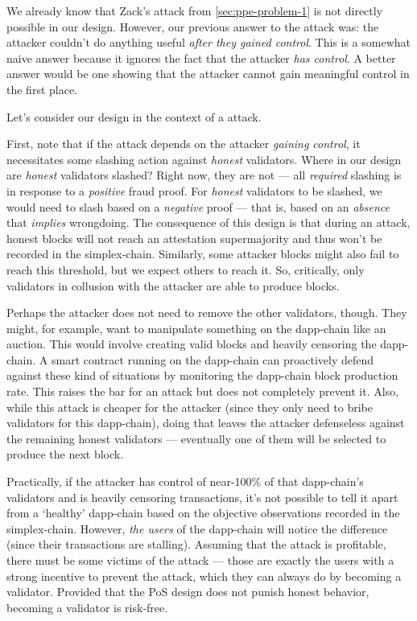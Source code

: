 We already know that Zack's attack from \autoref{sec:ppe-problem-1} is not directly possible in our design.
However, our previous answer to the attack was: the attacker couldn't do anything useful \emph{after they gained control}.
This is a somewhat naive answer because it ignores the fact that the attacker \emph{has control}.
A better answer would be one showing that the attacker cannot gain meaningful control in the first place.

Let's consider our design in the context of a \ppe attack.

First, note that if the attack depends on the attacker \emph{gaining control}, it necessitates some slashing action against \emph{honest} validators.
Where in our design are \emph{honest} validators slashed?
Right now, they are not --- all \emph{required} slashing is in response to a \emph{positive} fraud proof.
For \emph{honest} validators to be slashed, we would need to slash based on a \emph{negative} proof --- that is, based on an \emph{absence} that \emph{implies} wrongdoing.
The consequence of this design is that during an attack, honest blocks will not reach an attestation supermajority and thus won't be recorded in the simplex-chain.
Similarly, some attacker blocks might also fail to reach this threshold, but we expect others to reach it.
So, critically, only validators in collusion with the attacker are able to produce blocks.

Perhaps the attacker does not need to remove the other validators, though.
They might, for example, want to manipulate something on the dapp-chain like an auction.
This would involve creating valid blocks and heavily censoring the dapp-chain.
A smart contract running on the dapp-chain can proactively defend against these kind of situations by monitoring the dapp-chain block production rate.
This raises the bar for an attack but does not completely prevent it.
Also, while this attack is cheaper for the attacker (since they only need to bribe validators for this dapp-chain), doing that leaves the attacker defenseless against the remaining honest validators --- eventually one of them will be selected to produce the next block.

Practically, if the attacker has control of near-100\% of that dapp-chain's validators and is heavily censoring transactions, it's not possible to tell it apart from a `healthy' dapp-chain based on the objective observations recorded in the simplex-chain.
However, \emph{the users} of the dapp-chain will notice the difference (since their transactions are stalling).
Assuming that the attack is profitable, there must be some victims of the attack --- those are exactly the users with a strong incentive to prevent the attack, which they can always do by becoming a validator.
Provided that the PoS design does not punish honest behavior, becoming a validator is risk-free.

